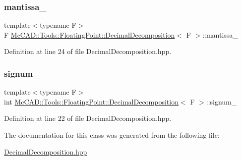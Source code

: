 \subsubsection{\texorpdfstring{mantissa\+\_\+}{mantissa\_}}
{\footnotesize\ttfamily template$<$typename F$>$ \\
F \hyperlink{classMcCAD_1_1Tools_1_1FloatingPoint_1_1DecimalDecomposition}{Mc\+C\+A\+D\+::\+Tools\+::\+Floating\+Point\+::\+Decimal\+Decomposition}$<$ F $>$\+::mantissa\+\_\+\hspace{0.3cm}{\ttfamily [private]}}



Definition at line 24 of file Decimal\+Decomposition.\+hpp.

\mbox{\label{classMcCAD_1_1Tools_1_1FloatingPoint_1_1DecimalDecomposition_a43f9b3dfaed90222862ab60d288f4337}} 
\subsubsection{\texorpdfstring{signum\+\_\+}{signum\_}}
{\footnotesize\ttfamily template$<$typename F$>$ \\
int \hyperlink{classMcCAD_1_1Tools_1_1FloatingPoint_1_1DecimalDecomposition}{Mc\+C\+A\+D\+::\+Tools\+::\+Floating\+Point\+::\+Decimal\+Decomposition}$<$ F $>$\+::signum\+\_\+\hspace{0.3cm}{\ttfamily [private]}}



Definition at line 22 of file Decimal\+Decomposition.\+hpp.



The documentation for this class was generated from the following file\+:\begin{DoxyCompactItemize}
\item 
\hyperlink{DecimalDecomposition_8hpp}{Decimal\+Decomposition.\+hpp}\end{DoxyCompactItemize}
